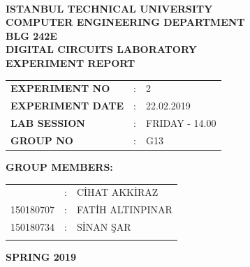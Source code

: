 \documentclass[pdftex,12pt,a4paper]{article}
\begin{document}
\begin{titlepage}
\begin{center}
\textbf{}\\
\textbf{\Large{ISTANBUL TECHNICAL UNIVERSITY}}\\
\vspace{0.5cm}
\textbf{\Large{COMPUTER ENGINEERING DEPARTMENT}}\\
\vspace{2cm}
\textbf{\Large{BLG 242E\\ DIGITAL CIRCUITS LABORATORY\\ EXPERIMENT REPORT}}\\
\vspace{2.8cm}
\begin{table}[ht]
\centering
\Large{
\begin{tabular}{lcl}
\textbf{EXPERIMENT NO}  & : & 2 \\
\textbf{EXPERIMENT DATE}  & : & 22.02.2019 \\
\textbf{LAB SESSION}  & : & FRIDAY - 14.00 \\
\textbf{GROUP NO}  & : & G13 \\
\end{tabular}}
\end{table}
\vspace{1cm}
\textbf{\Large{GROUP MEMBERS:}}\\
\begin{table}[ht]
\centering
\Large{
\begin{tabular}{rcl}
{
150180704  & : & C\.{I}HAT AKK\.{I}RAZ \\
150180707  & : & FAT\.{I}H ALTINPINAR \\
150180734  & : & S\.{I}NAN \c{S}AR \\
}
\end{tabular}}
\end{table}
\vspace{2.8cm}
\textbf{\Large{SPRING 2019}}

\end{center}

\end{titlepage}

\newpage
\newpage

\thispagestyle{empty}
\setcounter{tocdepth}{4}
\tableofcontents
\clearpage
\end{document}
